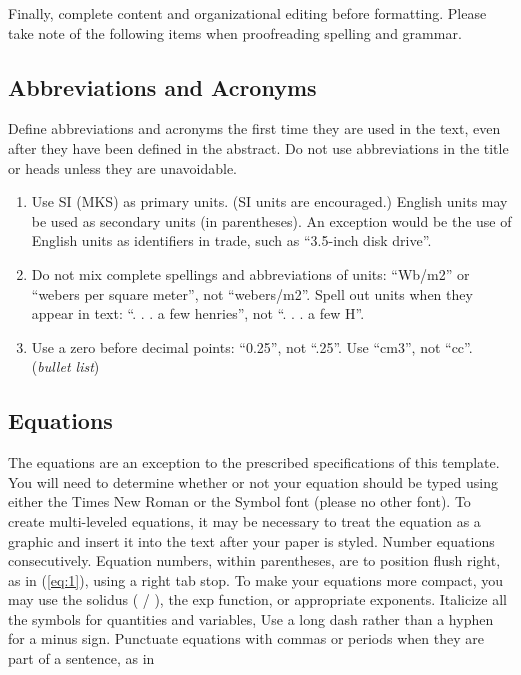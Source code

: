\documentclass{article} %
\begin{document}
\begin{multicols}{2}
Finally, complete content and organizational editing before formatting. Please take note of the following items when proofreading spelling and grammar.


\subsection{Abbreviations and Acronyms}

Define abbreviations and acronyms the first time they are used in the text, even after they have been defined in the abstract. Do not use abbreviations in the title or heads unless they are unavoidable.



\begin{enumerate}
\item \textit{ }Use SI (MKS) as primary units. (SI units are encouraged.) English units may be used as secondary units (in parentheses). An exception would be the use of English units as identifiers in trade, such as ``3.5-inch disk drive''.

\item  Do not mix complete spellings and abbreviations of units: ``Wb/m2'' or ``webers per square meter'', not ``webers/m2''.  Spell out units when they appear in text: ``. . . a few henries'', not ``. . . a few H''.

\item  Use a zero before decimal points: ``0.25'', not ``.25''. Use ``cm3'', not ``cc''. (\textit{bullet list})
\end{enumerate}


\subsection{Equations}

The equations are an exception to the prescribed specifications of this template. You will need to determine whether or not your equation should be typed using either the Times New Roman or the Symbol font (please no other font). To create multi-leveled equations, it may be necessary to treat the equation as a graphic and insert it into the text after your paper is styled.
Number equations consecutively. Equation numbers, within parentheses, are to position flush right, as in (\ref{eq:1}), using a right tab stop. To make your equations more compact, you may use the solidus ( / ), the exp function, or appropriate exponents. Italicize all the symbols for quantities and variables, Use a long dash rather than a hyphen for a minus sign. Punctuate equations with commas or periods when they are part of a sentence, as in


\end{multicols}
\end{document}

